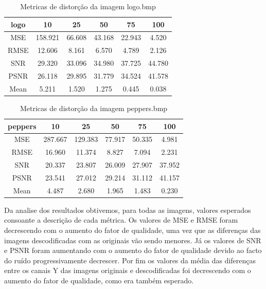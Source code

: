 \documentclass[a4paper, 12pt]{article}
\begin{document}
    \begin{table}[H]
            \centering
            \begin{tabular}{||c | c c c c c||} 
                \hline
                logo & 10 & 25 & 50 & 75 & 100 \\ 
                \hline\hline
                MSE &  158.921 &  66.608  & 43.168 & 22.943 &   4.520 \\
                RMSE &   12.606 &   8.161  &  6.570 &  4.789 &  2.126 \\
                SNR &   29.320  &  33.096  & 34.980 & 37.725 & 44.780 \\
                PSNR &   26.118 &   29.895 &  31.779&  34.524 & 41.578\\
                Mean &  5.211 &  1.520 &  1.275  &  0.445 & 0.038 \\
                \hline
            \end{tabular}
            \caption{\label{demo-table} Metricas de distorção da imagem logo.bmp}
        \end{table}

    \begin{table}[H]
            \centering
            \begin{tabular}{||c | c c c c c||} 
                \hline
                peppers & 10 & 25 & 50 & 75 & 100 \\ 
                \hline\hline
                MSE &    287.667 &  129.383  & 77.917 & 50.335 &   4.981 \\
                RMSE &   16.960 &   11.374  &  8.827 &  7.094 &  2.231 \\
                SNR &    20.337  &  23.807  & 26.009 & 27.907 & 37.952 \\
                PSNR &   23.541 &   27.012 &  29.214 & 31.112 & 41.157\\
                Mean &  4.487 &  2.680  &  1.965  & 1.483  & 0.230 \\
                \hline
            \end{tabular}
            \caption{\label{demo-table} Metricas de distorção da imagem peppers.bmp}
        \end{table}

    Da analise dos resultados obtivemos, para todas as imagens, valores esperados consoante a descrição de cada métrica. Os valores de MSE e RMSE foram decrescendo com o aumento do fator de qualidade, uma vez que as diferenças das imagens descodificadas com as originais vão sendo menores. Já os valores de SNR e PSNR foram aumentando com o aumento do fator de qualidade devido ao facto do ruído progressivamente decrescer. Por fim os valores da média das diferenças entre os canais Y das imagens originais e descodificadas foi decrescendo com o aumento do fator de qualidade, como era também esperado.
    
\end{document}
